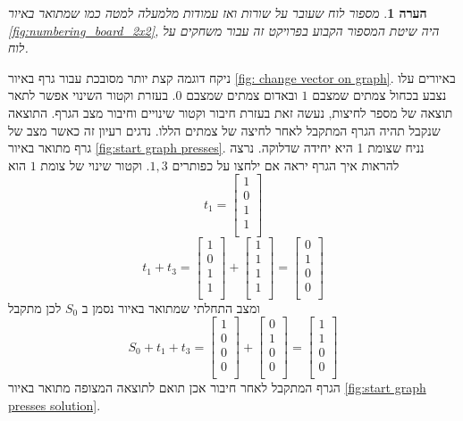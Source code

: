 \documentclass[12pt,leqno]{article}
\newtheorem{comm}{הערה}[section]
\begin{document}
\begin{comm}
    \label{ comm: indexing board game}
    מספור לוח שעובר על שורות ואז עמודות מלמעלה למטה כמו שמתואר באיור
    \ref{fig:numbering_board_2x2},
     היה שיטת המספור הקבוע בפרויקט זה עבור משחקים על לוח.
\end{comm}
ניקח דוגמה קצת יותר מסובכת
עבור גרף באיור
\ref{fig: change vector on graph}.
באיורים עלו נצבע בכחול צמתים שמצבם  
$1$
ובאדום 
צמתים שמצבם 
$0$.
בעזרת וקטור השינוי אפשר לתאר תוצאה של מספר לחיצות,
נעשה זאת בעזרת חיבור וקטור שינויים
וחיבור מצב הגרף.
התוצאה שנקבל 
תהיה הגרף המתקבל לאחר לחיצה של צמתים
הללו.
נדגים רעיון זה כאשר מצב של גרף מתואר באיור
\ref{fig:start graph presses}.
נניח שצומת 1 היא יחידה שדלוקה.
נרצה להראות איך הגרף יראה אם ילחצו על כפותרים 
$1, 3$.
וקטור שינוי של צומת 
$1$
הוא
\[
    t_1 = 
    \begin{bmatrix}
        1 \\
        0 \\
        1 \\
        1 \\
    \end{bmatrix}
\]
\[
    t_1 + t_3 = 
    \begin{bmatrix}
        1 \\
        0 \\
        1 \\
        1 \\
    \end{bmatrix}
    +
    \begin{bmatrix}
        1 \\
        1 \\
        1 \\
        1 \\
    \end{bmatrix}
    =
    \begin{bmatrix}
        0 \\
        1 \\
        0 \\
        0 \\
    \end{bmatrix}
\]
ומצב התחלתי שמתואר באיור נסמן ב
$S_0$
לכן מתקבל
\[
    S_0 + t_1 + t_3 = 
    \begin{bmatrix}
        1 \\
        0 \\
        0 \\
        0 \\
    \end{bmatrix}
    +
    \begin{bmatrix}
        0 \\
        1 \\
        0 \\
        0 \\
    \end{bmatrix}
    =
    \begin{bmatrix}
        1 \\
        1 \\
        0 \\
        0 \\
    \end{bmatrix}
\]
הגרף המתקבל לאחר חיבור אכן תואם לתוצאה המצופה
מתואר באיור 
\ref{fig:start graph presses solution}.
\end{document}
